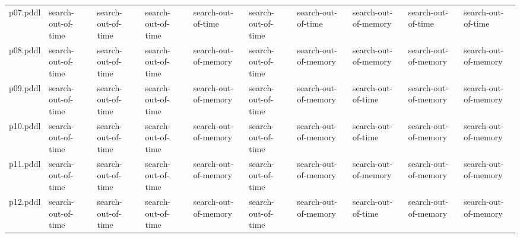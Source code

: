 \documentclass{article}
\begin{document}
\begin{tabular}{@{}lrrrrrrrrr@{}}
p07.pddl & \multicolumn{1}{|l|}{search-out-of-time} & \multicolumn{1}{|l|}{search-out-of-time} & \multicolumn{1}{|l|}{search-out-of-time} & \multicolumn{1}{|l|}{search-out-of-time} & \multicolumn{1}{|l|}{search-out-of-time} & \multicolumn{1}{|l|}{search-out-of-time} & \multicolumn{1}{|l|}{search-out-of-memory} & \multicolumn{1}{|l|}{search-out-of-time} & \multicolumn{1}{|l|}{search-out-of-time} \\
p08.pddl & \multicolumn{1}{|l|}{search-out-of-time} & \multicolumn{1}{|l|}{search-out-of-time} & \multicolumn{1}{|l|}{search-out-of-time} & \multicolumn{1}{|l|}{search-out-of-memory} & \multicolumn{1}{|l|}{search-out-of-time} & \multicolumn{1}{|l|}{search-out-of-memory} & \multicolumn{1}{|l|}{search-out-of-memory} & \multicolumn{1}{|l|}{search-out-of-memory} & \multicolumn{1}{|l|}{search-out-of-memory} \\
p09.pddl & \multicolumn{1}{|l|}{search-out-of-time} & \multicolumn{1}{|l|}{search-out-of-time} & \multicolumn{1}{|l|}{search-out-of-time} & \multicolumn{1}{|l|}{search-out-of-memory} & \multicolumn{1}{|l|}{search-out-of-time} & \multicolumn{1}{|l|}{search-out-of-memory} & \multicolumn{1}{|l|}{search-out-of-time} & \multicolumn{1}{|l|}{search-out-of-memory} & \multicolumn{1}{|l|}{search-out-of-memory} \\
p10.pddl & \multicolumn{1}{|l|}{search-out-of-time} & \multicolumn{1}{|l|}{search-out-of-time} & \multicolumn{1}{|l|}{search-out-of-time} & \multicolumn{1}{|l|}{search-out-of-memory} & \multicolumn{1}{|l|}{search-out-of-time} & \multicolumn{1}{|l|}{search-out-of-memory} & \multicolumn{1}{|l|}{search-out-of-time} & \multicolumn{1}{|l|}{search-out-of-memory} & \multicolumn{1}{|l|}{search-out-of-memory} \\
p11.pddl & \multicolumn{1}{|l|}{search-out-of-time} & \multicolumn{1}{|l|}{search-out-of-time} & \multicolumn{1}{|l|}{search-out-of-time} & \multicolumn{1}{|l|}{search-out-of-memory} & \multicolumn{1}{|l|}{search-out-of-time} & \multicolumn{1}{|l|}{search-out-of-memory} & \multicolumn{1}{|l|}{search-out-of-memory} & \multicolumn{1}{|l|}{search-out-of-memory} & \multicolumn{1}{|l|}{search-out-of-memory} \\
p12.pddl & \multicolumn{1}{|l|}{search-out-of-time} & \multicolumn{1}{|l|}{search-out-of-time} & \multicolumn{1}{|l|}{search-out-of-time} & \multicolumn{1}{|l|}{search-out-of-memory} & \multicolumn{1}{|l|}{search-out-of-time} & \multicolumn{1}{|l|}{search-out-of-memory} & \multicolumn{1}{|l|}{search-out-of-time} & \multicolumn{1}{|l|}{search-out-of-memory} & \multicolumn{1}{|l|}{search-out-of-memory} \\

\end{tabular}
\end{document}
